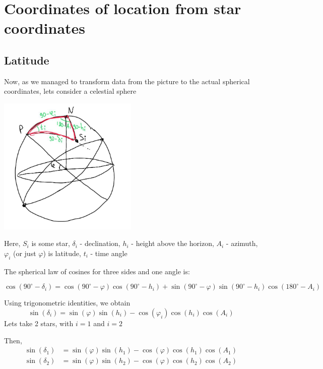 \documentclass[a4paper,12pt]{article}
\begin{document}
\section{Coordinates of location from star coordinates}
\subsection{Latitude}
Now, as we managed to transform data from the picture to the actual spherical coordinates, lets consider a celestial sphere
\par
   \centering
    \includegraphics[width=0.5\textwidth]{spherical_geom.jpg}
\par
Here, \(S_i\) is some star, \(\delta_i\) - declination, \(h_i\) - height above the horizon, \(A_i\) - azimuth, \(\varphi_i\) (or just \(\varphi\)) is latitude, \(t_i\) - time angle
\par \par

The spherical law of cosines for three sides and one angle is:

\begin{equation}
\cos (90^\circ - \delta_i) = \cos(90^\circ - \varphi) \cos(90^\circ - h_i) + \sin(90^\circ - \varphi) \sin(90^\circ - h_i) \cos(180^\circ - A_i)
\end{equation}


Using trigonometric identities, we obtain
\begin{equation}
\sin (\delta_i) = \sin( \varphi) \sin( h_i )- \cos (\varphi_i )\cos (h_i) \cos (A_i)
\end{equation}
Lets take 2 stars, with \( i = 1\) and \( i = 2\)
\par
Then, 
\begin{equation}
\begin{aligned}
\sin (\delta_1) &= \sin( \varphi) \sin( h_1 ) - \cos (\varphi )\cos (h_1) \cos (A_1) \\
\sin (\delta_2) &= \sin( \varphi) \sin( h_2 ) - \cos (\varphi )\cos (h_2) \cos (A_2)
\end{aligned}
\end{equation}
\end{document}
